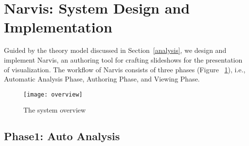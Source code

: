 \section{Narvis: System Design and Implementation}


Guided by the theory model discussed in Section~\ref{analysis},  we design and implement Narvis, an authoring tool for crafting slideshows for the presentation of visualization. The workflow of Narvis consists of three phases (Figure ~\ref{fig:overview}), i.e., Automatic Analysis Phase, Authoring Phase, and Viewing Phase.


\begin{figure}
 \centering %
 \texttt{[image: overview]}
 \caption{The system overview}
 \label{fig:overview}
\end{figure}

\subsection{Phase1: Auto Analysis}


